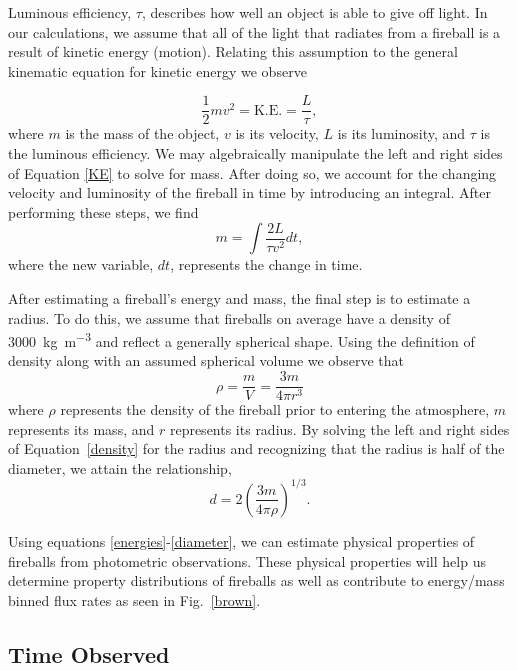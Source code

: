 Luminous efficiency, $\tau$, describes how well an object is able to give off light.  
In our calculations, we assume that all of the light that radiates from a fireball is a result of kinetic energy (motion).
Relating this assumption to the general kinematic equation for kinetic energy we observe

\begin{equation}
\frac{1}{2}mv^2 = \text{K.E.} = \frac{L}{\tau},
\label{KE}
\end{equation}
where $m$ is the mass of the object, $v$ is its velocity, $L$ is its luminosity, and $\tau$ is the luminous efficiency. 
We may algebraically manipulate the left and right sides of Equation \ref{KE} to solve for mass.
After doing so, we account for the changing velocity and luminosity of the fireball in time by introducing an integral.
After performing these steps, we find
\begin{equation}
m = \int \frac{2L}{\tau v^2} dt,
\label{eq:mass}
\end{equation}
where the new variable, $dt$, represents the change in time.

After estimating a fireball's energy and mass, the final step is to estimate a radius.
To do this, we assume that fireballs on average have a density of \SI{3000}{\kilo\gram \per \meter^{3}} and reflect a generally spherical shape.
Using the definition of density along with an assumed spherical volume we observe that
\begin{equation}
\rho = \frac{m}{V} =  \frac{3m}{4\pi r^3}
\label{density}
\end{equation}
where $\rho$ represents the density of the fireball prior to entering the atmosphere, $m$ represents its mass, and $r$ represents its radius.
By solving the left and right sides of Equation~\ref{density} for the radius and recognizing that the radius is half of the diameter, we attain the relationship,
\begin{equation}
d = 2(\frac{3m}{4\pi \rho})^{1/3}.
\label{diameter}
\end{equation}

Using equations \ref{energies}-\ref{diameter}, we can estimate physical properties of fireballs from photometric observations.
These physical properties will help us determine property distributions of fireballs as well as contribute to energy/mass binned flux rates as seen in Fig.~\ref{brown}.



\subsection{Time Observed}

